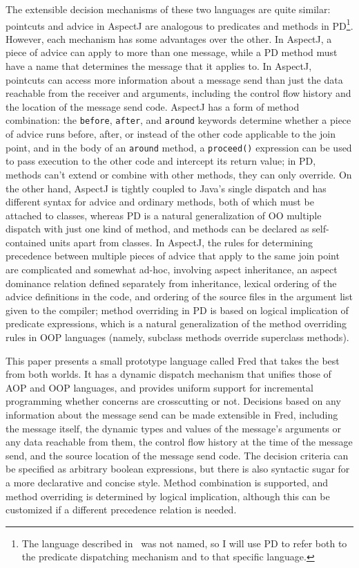 \documentclass{acm_proc_article-sp}
\newcommand{\code}[1]{\texttt{#1}}
\begin{document}
The extensible decision mechanisms of these two languages are quite
similar: pointcuts and advice in AspectJ are analogous to predicates
and methods in PD\footnote{The language described
in~\cite{predicate-dispatching} was not named, so I will use PD to
refer both to the predicate dispatching mechanism and to that specific
language.}.  However, each mechanism has some advantages over the
other.  In AspectJ, a piece of advice can apply to more than one
message, while a PD method must have a name that determines the
message that it applies to.  In AspectJ, pointcuts can access more
information about a message send than just the data reachable from the
receiver and arguments, including the control flow history and the
location of the message send code.  AspectJ has a form of method
combination: the \code{before}, \code{after}, and \code{around}
keywords determine whether a piece of advice runs before, after, or
instead of the other code applicable to the join point, and in the
body of an \code{around} method, a \code{proceed()} expression can be
used to pass execution to the other code and intercept its return
value; in PD, methods can't extend or combine with other methods, they
can only override.  On the other hand, AspectJ is tightly coupled to
Java's single dispatch and has different syntax for advice and
ordinary methods, both of which must be attached to classes, whereas
PD is a natural generalization of OO multiple dispatch with just one
kind of method, and methods can be declared as self-contained units
apart from classes.  In AspectJ, the rules for determining precedence
between multiple pieces of advice that apply to the same join point
are complicated and somewhat ad-hoc, involving aspect inheritance, an
aspect dominance relation defined separately from inheritance, lexical
ordering of the advice definitions in the code, and ordering of the
source files in the argument list given to the compiler; method
overriding in PD is based on logical implication of predicate
expressions, which is a natural generalization of the method
overriding rules in OOP languages (namely, subclass methods override
superclass methods).

This paper presents a small prototype language called Fred that takes
the best from both worlds.  It has a dynamic dispatch mechanism that
unifies those of AOP and OOP languages, and provides uniform support
for incremental programming whether concerns are crosscutting or not.
Decisions based on any information about the message send can be made
extensible in Fred, including the message itself, the dynamic types
and values of the message's arguments or any data reachable from them,
the control flow history at the time of the message send, and the
source location of the message send code.  The decision criteria can
be specified as arbitrary boolean expressions, but there is also
syntactic sugar for a more declarative and concise style.  Method
combination is supported, and method overriding is determined by
logical implication, although this can be customized if a different
precedence relation is needed.
\end{document}
